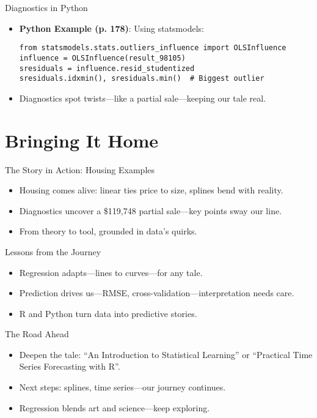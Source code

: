 \documentclass{beamer}
\begin{document}
\begin{frame}[fragile]{Diagnostics in Python}
  \begin{itemize}
    \item \textbf{Python Example (p. 178)}: Using statsmodels:
      \lstset{language=Python}
      \begin{lstlisting}
from statsmodels.stats.outliers_influence import OLSInfluence
influence = OLSInfluence(result_98105)
sresiduals = influence.resid_studentized
sresiduals.idxmin(), sresiduals.min()  # Biggest outlier
      \end{lstlisting}
    \item Diagnostics spot twists—like a partial sale—keeping our tale real.
  \end{itemize}
\end{frame}

\section{Bringing It Home}

\begin{frame}{The Story in Action: Housing Examples}
  \begin{itemize}
    \item Housing comes alive: linear ties price to size, splines bend with reality.
    \item Diagnostics uncover a \$119,748 partial sale—key points sway our line.
    \item From theory to tool, grounded in data’s quirks.
  \end{itemize}
\end{frame}

\begin{frame}{Lessons from the Journey}
  \begin{itemize}
    \item Regression adapts—lines to curves—for any tale.
    \item Prediction drives us—RMSE, cross-validation—interpretation needs care.
    \item R and Python turn data into predictive stories.
  \end{itemize}
\end{frame}

\begin{frame}{The Road Ahead}
  \begin{itemize}
    \item Deepen the tale: ``An Introduction to Statistical Learning'' or ``Practical Time Series Forecasting with R''.
    \item Next steps: splines, time series—our journey continues.
    \item Regression blends art and science—keep exploring.
  \end{itemize}
\end{frame}
\end{document}
